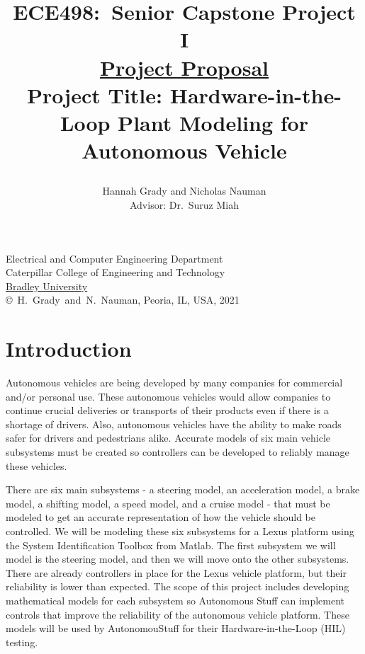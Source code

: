 \documentclass[letterpaper,12pt]{article}   %
\title{ECE498:~Senior Capstone Project I\\\textbf{\underline{Project Proposal}}\\
\vspace{0.5in}
Project Title: Hardware-in-the-Loop Plant Modeling for Autonomous Vehicle 
\vspace{1.0in}
\author{Hannah Grady and Nicholas Nauman\\ Advisor: Dr.~Suruz Miah}
}
\date{}  %
\begin{document}
\begin{titlepage}
 \maketitle

\vspace*{4.0cm}
\begin{center}
\normalsize
Electrical and Computer Engineering Department\\
Caterpillar College of Engineering and Technology\\
\href{http://www.bradley.edu/}{Bradley University}\\

\vspace*{6.0cm}
\copyright~H.~Grady~and~N.~Nauman, Peoria, IL, USA, 2021\\

\end{center}
\thispagestyle{empty}

\end{titlepage} 
\newpage
\renewcommand{\contentsname}{Table of Contents}
\tableofcontents
\newpage

\section{Introduction}
Autonomous vehicles are being developed by many companies for commercial and/or personal use. These autonomous vehicles would allow companies to continue crucial deliveries or transports of their products even if there is a shortage of drivers. Also, autonomous vehicles have the ability to make roads safer for drivers and pedestrians alike. Accurate models of six main vehicle subsystems must be created so controllers can be developed to reliably manage these vehicles.

There are six main subsystems - a steering model, an acceleration model, a brake
model, a shifting model, a speed model, and a cruise model - that must be
modeled to get an accurate representation of how the vehicle should be
controlled. We will be modeling these six subsystems for a Lexus platform using
the System Identification Toolbox from Matlab. The first subsystem we will model is the steering model, and then we will move onto the other subsystems. There are already controllers in place for the Lexus vehicle platform, but their reliability is lower than expected. The scope of this project includes developing mathematical models for each subsystem so Autonomous Stuff can implement controls that improve the reliability of the autonomous vehicle platform. These models will be used by AutonomouStuff for their Hardware-in-the-Loop (HIL) testing.
\end{document}
